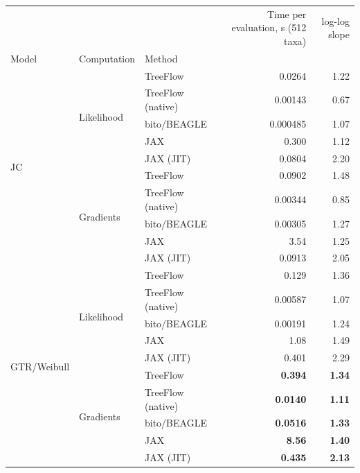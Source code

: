\begin{tabular}{lllrr}
\toprule
 &  &  & Time per evaluation, s (512 taxa) & log-log slope \\
Model & Computation & Method &  &  \\
\midrule
\multirow[t]{10}{*}{JC} & \multirow[t]{5}{*}{Likelihood} & TreeFlow & 0.0264 & 1.22 \\
 &  & TreeFlow (native) & 0.00143 & 0.67 \\
 &  & bito/BEAGLE & 0.000485 & 1.07 \\
 &  & JAX & 0.300 & 1.12 \\
 &  & JAX (JIT) & 0.0804 & 2.20 \\
 & \multirow[t]{5}{*}{Gradients} & TreeFlow & 0.0902 & 1.48 \\
 &  & TreeFlow (native) & 0.00344 & 0.85 \\
 &  & bito/BEAGLE & 0.00305 & 1.27 \\
 &  & JAX & 3.54 & 1.25 \\
 &  & JAX (JIT) & 0.0913 & 2.05 \\
\multirow[t]{10}{*}{GTR/Weibull} & \multirow[t]{5}{*}{Likelihood} & TreeFlow & 0.129 & 1.36 \\
 &  & TreeFlow (native) & 0.00587 & 1.07 \\
 &  & bito/BEAGLE & 0.00191 & 1.24 \\
 &  & JAX & 1.08 & 1.49 \\
 &  & JAX (JIT) & 0.401 & 2.29 \\
 & \multirow[t]{5}{*}{Gradients} & TreeFlow & \bfseries 0.394 & \bfseries 1.34 \\
 &  & TreeFlow (native) & \bfseries 0.0140 & \bfseries 1.11 \\
 &  & bito/BEAGLE & \bfseries 0.0516 & \bfseries 1.33 \\
 &  & JAX & \bfseries 8.56 & \bfseries 1.40 \\
 &  & JAX (JIT) & \bfseries 0.435 & \bfseries 2.13 \\
\bottomrule
\end{tabular}
